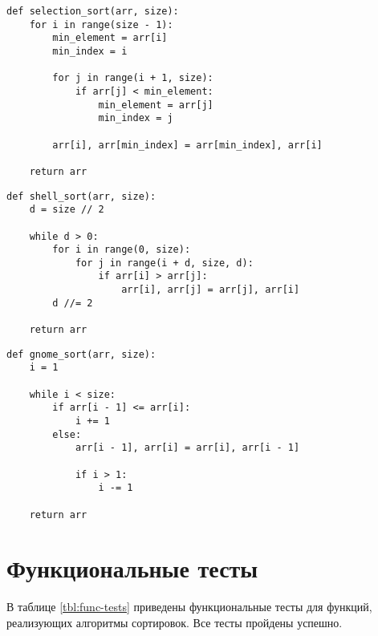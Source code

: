 \begin{center}
\captionsetup{justification=raggedright,singlelinecheck=off}
\begin{lstlisting}[label=lst:selection_sort,caption=Алгоритм сортировки выбором]
def selection_sort(arr, size):
    for i in range(size - 1):
        min_element = arr[i]
        min_index = i

        for j in range(i + 1, size):
            if arr[j] < min_element:
                min_element = arr[j]
                min_index = j
        
        arr[i], arr[min_index] = arr[min_index], arr[i]

	return arr
\end{lstlisting} 
\end{center}

\begin{center}
\captionsetup{justification=raggedright,singlelinecheck=off}
\begin{lstlisting}[label=lst:shell_sort,caption=Алгоритм сортировки Шелла]
def shell_sort(arr, size):
    d = size // 2

    while d > 0:
        for i in range(0, size):
            for j in range(i + d, size, d):
                if arr[i] > arr[j]:
                    arr[i], arr[j] = arr[j], arr[i]
        d //= 2

	return arr
\end{lstlisting}
\end{center}

\clearpage

\begin{center}
\captionsetup{justification=raggedright,singlelinecheck=off}
\begin{lstlisting}[label=lst:gnome_sort,caption=Алгоритм гномьей сортировки]
def gnome_sort(arr, size):
    i = 1

    while i < size:
        if arr[i - 1] <= arr[i]:
            i += 1
        else:
            arr[i - 1], arr[i] = arr[i], arr[i - 1]

            if i > 1:
                i -= 1

	return arr
\end{lstlisting}
\end{center}

\section{Функциональные тесты}

В таблице \ref{tbl:func-tests} приведены функциональные тесты для функций, реализующих алгоритмы сортировок. Все тесты пройдены успешно.


